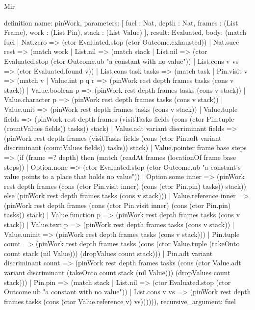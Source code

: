 \begin{lexlean}{Mir}
\begin{semanticmodule}
definition{
  name: pinWork,
  parameters: [
    fuel : Nat,
    depth : Nat,
    frames : (List Frame),
    work : (List Pin),
    stack : (List Value)
  ],
  result: Evaluated,
  body: (match fuel
    | Nat.zero => (ctor Evaluated.stop (ctor Outcome.exhausted))
    | Nat.succ rest => (match work
      | List.nil => (match stack
        | List.nil => (ctor Evaluated.stop (ctor Outcome.ub "a constant with no value"))
        | List.cons v vs => (ctor Evaluated.found v))
      | List.cons task tasks => (match task
        | Pin.visit v => (match v
          | Value.int p q r => (pinWork rest depth frames tasks (cons v stack))
          | Value.boolean p => (pinWork rest depth frames tasks (cons v stack))
          | Value.character p => (pinWork rest depth frames tasks (cons v stack))
          | Value.unit => (pinWork rest depth frames tasks (cons v stack))
          | Value.tuple fields => (pinWork rest depth frames (visitTasks fields (cons (ctor Pin.tuple (countValues fields)) tasks)) stack)
          | Value.adt variant discriminant fields => (pinWork rest depth frames (visitTasks fields (cons (ctor Pin.adt variant discriminant (countValues fields)) tasks)) stack)
          | Value.pointer frame base steps => (if (frame =? depth) then (match (readAt frames (locationOf frame base steps))
            | Option.none => (ctor Evaluated.stop (ctor Outcome.ub "a constant's value points to a place that holds no value"))
            | Option.some inner => (pinWork rest depth frames (cons (ctor Pin.visit inner) (cons (ctor Pin.pin) tasks)) stack)) else (pinWork rest depth frames tasks (cons v stack)))
          | Value.reference inner => (pinWork rest depth frames (cons (ctor Pin.visit inner) (cons (ctor Pin.pin) tasks)) stack)
          | Value.function p => (pinWork rest depth frames tasks (cons v stack))
          | Value.text p => (pinWork rest depth frames tasks (cons v stack))
          | Value.uninit => (pinWork rest depth frames tasks (cons v stack)))
        | Pin.tuple count => (pinWork rest depth frames tasks (cons (ctor Value.tuple (takeOnto count stack (nil Value))) (dropValues count stack)))
        | Pin.adt variant discriminant count => (pinWork rest depth frames tasks (cons (ctor Value.adt variant discriminant (takeOnto count stack (nil Value))) (dropValues count stack)))
        | Pin.pin => (match stack
          | List.nil => (ctor Evaluated.stop (ctor Outcome.ub "a constant with no value"))
          | List.cons v vs => (pinWork rest depth frames tasks (cons (ctor Value.reference v) vs)))))),
  recursive_argument: fuel
}


\end{semanticmodule}
\end{lexlean}
